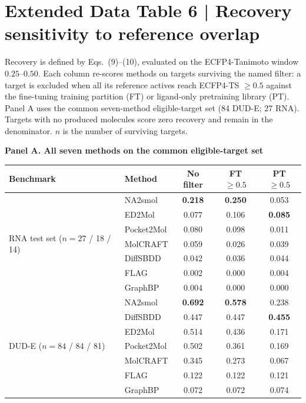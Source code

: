 \section*{Extended Data Table 6 | Recovery sensitivity to reference overlap}
Recovery is defined by Eqs.~(9)--(10), evaluated on the ECFP4-Tanimoto window $0.25$--$0.50$. Each column re-scores methods on targets surviving the named filter: a target is excluded when all its reference actives reach ECFP4-TS $\geq0.5$ against the fine-tuning training partition (FT) or ligand-only pretraining library (PT). Panel A uses the common seven-method eligible-target set (84 DUD-E; 27 RNA). Targets with no produced molecules score zero recovery and remain in the denominator. $n$ is the number of surviving targets.

\textbf{Panel A. All seven methods on the common eligible-target set}
\begin{center}\footnotesize
\setlength{\tabcolsep}{5pt}
\begin{tabular}{@{}llccc@{}}
\toprule
\textbf{Benchmark} & \textbf{Method} & \textbf{No filter} & \textbf{FT $\geq0.5$} & \textbf{PT $\geq0.5$} \\
\midrule
\multirow{7}{*}{RNA test set ($n=27$ / 18 / 14)}
  & NA2smol    & \textbf{0.218} & \textbf{0.250} & 0.053 \\
  & ED2Mol     & 0.077 & 0.106 & \textbf{0.085} \\
  & Pocket2Mol & 0.080 & 0.098 & 0.011 \\
  & MolCRAFT   & 0.059 & 0.026 & 0.039 \\
  & DiffSBDD   & 0.042 & 0.036 & 0.044 \\
  & FLAG       & 0.002 & 0.000 & 0.004 \\
  & GraphBP    & 0.004 & 0.000 & 0.000 \\
\midrule
\multirow{7}{*}{DUD-E ($n=84$ / 84 / 81)}
  & NA2smol    & \textbf{0.692} & \textbf{0.578} & 0.238 \\
  & DiffSBDD   & 0.447 & 0.447 & \textbf{0.455} \\
  & ED2Mol     & 0.514 & 0.436 & 0.171 \\
  & Pocket2Mol & 0.502 & 0.361 & 0.169 \\
  & MolCRAFT   & 0.345 & 0.273 & 0.067 \\
  & FLAG       & 0.122 & 0.122 & 0.121 \\
  & GraphBP    & 0.072 & 0.072 & 0.074 \\
\bottomrule
\end{tabular}\end{center}

